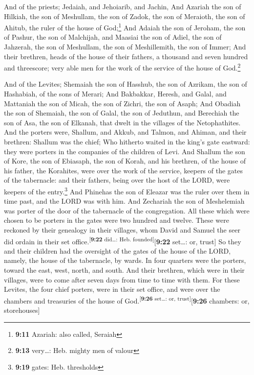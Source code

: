  And of the priests; Jedaiah, and Jehoiarib, and Jachin,
 And Azariah the son of Hilkiah, the son of Meshullam,
the son of Zadok, the son of Meraioth, the son of Ahitub, the ruler of
the house of God;\footnote{\textbf{9:11} Azariah: also called, Seraiah}
 And Adaiah the son of Jeroham, the son of Pashur, the
son of Malchijah, and Maasiai the son of Adiel, the son of Jahzerah, the
son of Meshullam, the son of Meshillemith, the son of Immer;
 And their brethren, heads of the house of their fathers,
a thousand and seven hundred and threescore; very able men for the work
of the service of the house of God.\footnote{\textbf{9:13} very\ldots:
  Heb. mighty men of valour}

 And of the Levites; Shemaiah the son of Hasshub, the son
of Azrikam, the son of Hashabiah, of the sons of Merari; 
And Bakbakkar, Heresh, and Galal, and Mattaniah the son of Micah, the
son of Zichri, the son of Asaph;  And Obadiah the son of
Shemaiah, the son of Galal, the son of Jeduthun, and Berechiah the son
of Asa, the son of Elkanah, that dwelt in the villages of the
Netophathites.  And the porters were, Shallum, and Akkub,
and Talmon, and Ahiman, and their brethren: Shallum was the chief;
 Who hitherto waited in the king's gate eastward: they
were porters in the companies of the children of Levi. 
And Shallum the son of Kore, the son of Ebiasaph, the son of Korah, and
his brethren, of the house of his father, the Korahites, were over the
work of the service, keepers of the gates of the tabernacle: and their
fathers, being over the host of the LORD, were keepers of the
entry.\footnote{\textbf{9:19} gates: Heb. thresholds} 
And Phinehas the son of Eleazar was the ruler over them in time past,
and the LORD was with him.  And Zechariah the son of
Meshelemiah was porter of the door of the tabernacle of the
congregation.  All these which were chosen to be porters
in the gates were two hundred and twelve. These were reckoned by their
genealogy in their villages, whom David and Samuel the seer did ordain
in their set office.\textsuperscript{{[}\textbf{9:22} did\ldots: Heb.
founded{]}}{[}\textbf{9:22} set\ldots: or, trust{]}  So
they and their children had the oversight of the gates of the house of
the LORD, namely, the house of the tabernacle, by wards. 
In four quarters were the porters, toward the east, west, north, and
south.  And their brethren, which were in their villages,
were to come after seven days from time to time with them.
 For these Levites, the four chief porters, were in their
set office, and were over the chambers and treasuries of the house of
God.\textsuperscript{{[}\textbf{9:26} set\ldots: or,
trust{]}}{[}\textbf{9:26} chambers: or, storehouses{]}


